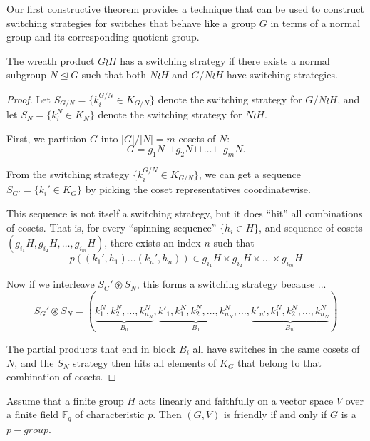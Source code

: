 Our first constructive theorem provides a technique that can be used to
construct switching strategies for switches that behave like a group $G$ in
terms of a normal group and its corresponding quotient group.
\begin{theorem}
  The wreath product $G \wr H$ has a switching strategy if there exists a
  normal subgroup $N \trianglelefteq G$ such that both $N \wr H$ and
  $G/N \wr H$ have switching strategies.
\label{thm:switchingStrategyDecomposition}
\end{theorem}
\begin{proof}
  Let $S_{G/N} = \{k_i^{G/N} \in K_{G/N}\}$ denote the switching strategy for $G/N \wr H$, and
  let $S_{N} = \{k_i^N \in K_{N}\}$ denote the switching strategy for $N \wr H$.

  First, we partition $G$ into $|G|/|N| = m$ cosets of $N$: \[
    G = g_1N \sqcup g_2N \sqcup \dots \sqcup g_mN.
  \]

  From the switching strategy $\{k_i^{G/N} \in K_{G/N}\}$,
  we can get a sequence $S_{G'} = \{k_i' \in K_G\}$
  by picking the coset representatives coordinatewise.

  This sequence is not itself a switching strategy, but it does ``hit'' all
  combinations of cosets. That is, for every ``spinning sequence'' $\{h_i \in H\}$,
  and sequence of cosets $(g_{i_1}H, g_{i_2}H, \dots, g_{i_m}H)$, there exists
  an index $n$ such that \[
    p((k_1', h_1) \dots (k_n', h_n)) \in g_{i_1}H \times g_{i_2}H \times \dots \times g_{i_m}H
  \]

  Now if we interleave $S_G' \circledast S_N$, this forms a
  switching strategy because ... \[
    S_G' \circledast S_N = (\underbrace{k^N_1, k^N_2, \dots, k^N_{n_N}}_{B_0}, \underbrace{k'_1, k^N_1, k^N_2, \dots, k^N_{n_N}}_{B_1}, \dots, \underbrace{k'_{n'}, k^N_1, k^N_2, \dots, k^N_{n_N}}_{B_{n'}})
  \]

  The partial products that end in block $B_i$ all have switches in the same
  cosets of $N$, and the $S_N$ strategy then hits all elements of $K_G$ that
  belong to that combination of cosets.

\end{proof}
\begin{theorem} \cite{Rabinovich2022}
  Assume that a finite group $H$ acts linearly and faithfully on a vector space
  $V$ over a finite field $\mathbb F_q$ of characteristic $p$.
  Then $(G, V)$ is friendly if and only if $G$ is a $p-group$.
\end{theorem}
